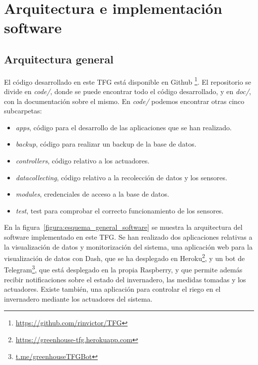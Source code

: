\documentclass[a4paper, 12pt, oneside]{book}
\begin{document}

	
\section{Arquitectura e implementación software}
\label{sec:Arquitectura e implementación software}

\subsection{Arquitectura general}
\label{subsec:arquitectura general}
El código desarrollado en este TFG está disponible en Github \footnote{\url{https://github.com/rinvictor/TFG}}. El repositorio se divide en \textit{code/}, donde se puede encontrar todo el código desarrollado, y en \textit{doc/}, con la documentación sobre el mismo.
En \textit{code/} podemos encontrar otras cinco subcarpetas:
\begin{itemize}
\item \textit{apps}, código para el desarrollo de las aplicaciones que se han realizado.
\item \textit{backup}, código para realizar un backup de la base de datos.
\item \textit{controllers}, código relativo a los actuadores.
\item \textit{datacollecting}, código relativo a la recolección de datos y los sensores.
\item \textit{modules}, credenciales de acceso a la base de datos.
\item \textit{test}, test para comprobar el correcto funcionamiento de los sensores.
\end{itemize}

En la figura~\ref{figura:esquema_general_software} se muestra la arquitectura del software implementado en este TFG. Se han realizado dos aplicaciones relativas a la visualización de datos y monitorización del sistema, una aplicación web para la visualización de datos con Dash, que se ha desplegado en Heroku\footnote{\url{https://greenhouse-tfg.herokuapp.com}}, y un bot de Telegram\footnote{\url{t.me/greenhouseTFGBot}}, que está desplegado en la propia Raspberry, y que permite además recibir notificaciones sobre el estado del invernadero, las medidas tomadas y los actuadores.
Existe también, una aplicación para controlar el riego en el invernadero mediante los actuadores del sistema.
\end{document}
